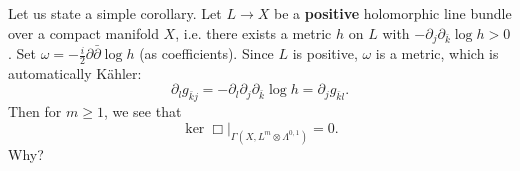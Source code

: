 \documentclass{../mathnotes}
\begin{document}
Let us state a simple corollary. Let $L\to X$ be a \textbf{positive} holomorphic line bundle over a compact manifold $X$, i.e. there exists a metric $h$ on $L$
with $-\partial_{j}\partial_{\bar k}\log h>0$. Set $\omega=-\frac{i}{2}\partial\bar\partial\log h$ (as coefficients). Since $L$ is positive, $\omega$ is a metric, which
is automatically K\"ahler:
\[\partial_l g_{\bar kj}=-\partial_l\partial_j\partial_{\bar k}\log h=\partial_j g_{\bar kl}.\]
Then for $m\geq 1$, we see that
\[\ker\Box\bigg|_{\Gamma(X,L^m\otimes\Lambda^{0,1})}=0.\]
Why?
\end{document}
